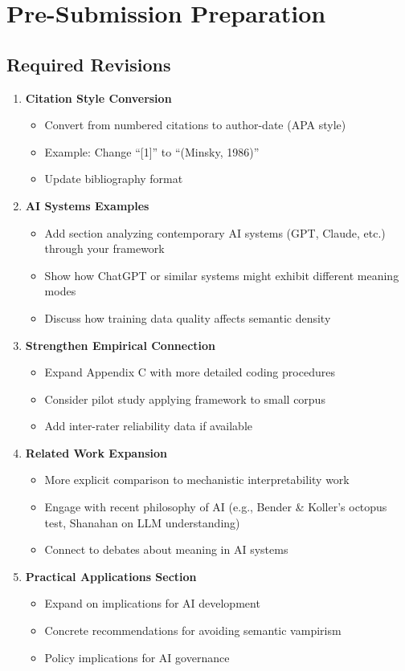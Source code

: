 \documentclass[12pt]{article}
\begin{document}
\section{Pre-Submission Preparation}

\subsection{Required Revisions}

\begin{enumerate}[leftmargin=*]
\item \textbf{Citation Style Conversion}
\begin{itemize}
\item Convert from numbered citations to author-date (APA style)
\item Example: Change ``[1]'' to ``(Minsky, 1986)''
\item Update bibliography format
\end{itemize}

\item \textbf{AI Systems Examples}
\begin{itemize}
\item Add section analyzing contemporary AI systems (GPT, Claude, etc.) through your framework
\item Show how ChatGPT or similar systems might exhibit different meaning modes
\item Discuss how training data quality affects semantic density
\end{itemize}

\item \textbf{Strengthen Empirical Connection}
\begin{itemize}
\item Expand Appendix C with more detailed coding procedures
\item Consider pilot study applying framework to small corpus
\item Add inter-rater reliability data if available
\end{itemize}

\item \textbf{Related Work Expansion}
\begin{itemize}
\item More explicit comparison to mechanistic interpretability work
\item Engage with recent philosophy of AI (e.g., Bender \& Koller's octopus test, Shanahan on LLM understanding)
\item Connect to debates about meaning in AI systems
\end{itemize}

\item \textbf{Practical Applications Section}
\begin{itemize}
\item Expand on implications for AI development
\item Concrete recommendations for avoiding semantic vampirism
\item Policy implications for AI governance
\end{itemize}
\end{enumerate}
\end{document}
